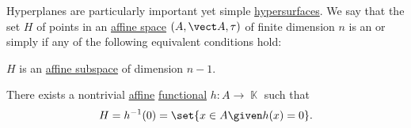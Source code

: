 \begin{definition}\label{def:affine_hyperplane}
  Hyperplanes are particularly important yet simple \hyperref[con:geometric_shape]{hypersurfaces}. We say that the set \( H \) of points in an \hyperref[def:affine_space]{affine space} \( (A, \vect A, \tau) \) of finite dimension \( n \) is an  or simply  if any of the following equivalent conditions hold:

  \begin{thmenum}
     \( H \) is an \hyperref[def:affine_subspace]{affine subspace} of dimension \( n - 1 \).

     There exists a nontrivial \hyperref[def:affine_operator]{affine} \hyperref[con:functional]{functional} \( h: A \to \BbbK \) such that
    \begin{equation*}
      H = h^{-1}(0) = \set{ x \in A \given h(x) = 0 }.
    \end{equation*}
  \end{thmenum}
\end{definition}
